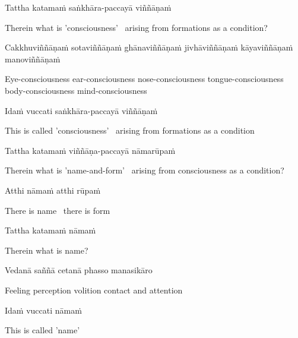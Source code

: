 Tattha katamaṁ saṅkhāra-paccayā viññāṇaṁ

\begin{cprenglish}
  Therein what is 'consciousness' \breathmark\ arising from formations as a condition?
\end{cprenglish}

Cakkhuviññāṇaṁ sotaviññāṇaṁ ghānaviññāṇaṁ jivhāviññāṇaṁ kāyaviññāṇaṁ manoviññāṇaṁ

\begin{cprenglish}
  Eye-consciousness ear-consciousness nose-consciousness tongue-consciousness body-consciousness mind-consciousness
\end{cprenglish}

Idaṁ vuccati saṅkhāra-paccayā viññāṇaṁ

\begin{cprenglish}
  This is called 'consciousness' \breathmark\ arising from formations as a condition
\end{cprenglish}

Tattha katamaṁ viññāṇa-paccayā nāmarūpaṁ

\begin{cprenglish}
  Therein what is 'name-and-form' \breathmark\ arising from consciousness as a condition?
\end{cprenglish}

Atthi nāmaṁ atthi rūpaṁ

\begin{cprenglish}
  There is name \breathmark\ there is form
\end{cprenglish}

Tattha katamaṁ nāmaṁ

\begin{cprenglish}
  Therein what is name?
\end{cprenglish}

Vedanā saññā cetanā phasso manasikāro

\begin{cprenglish}
  Feeling perception volition contact and attention
\end{cprenglish}

Idaṁ vuccati nāmaṁ

\begin{cprenglish}
  This is called 'name'
\end{cprenglish}

